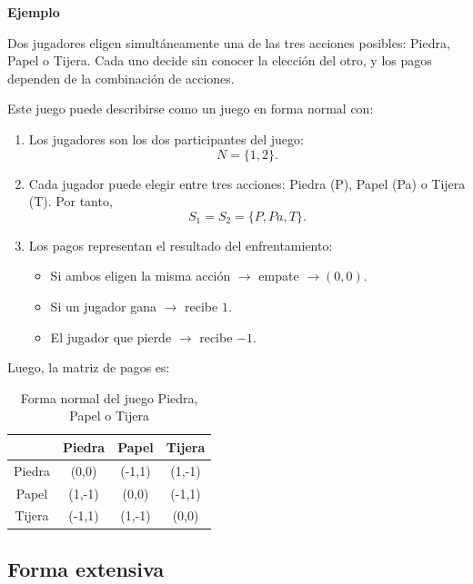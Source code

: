\documentclass[12pt,a4paper,]{book}
\numberwithin{dummy}{section}
\theoremstyle{ocrenumbox}
\theoremstyle{blacknumex}
\theoremstyle{blacknumbox}
\theoremstyle{ocrenum}
\theoremstyle{ocrenum}
\begin{document}
\begin{tcolorbox}[colback=blue!10]
\textbf{Ejemplo}

Dos jugadores eligen simultáneamente una de las tres acciones posibles: Piedra, Papel o Tijera. 
Cada uno decide sin conocer la elección del otro, y los pagos dependen de la combinación de acciones.

Este juego puede describirse como un juego en forma normal con:

\begin{enumerate}
    \item Los jugadores son los dos participantes del juego:
    \[
    N = \{1,2\}.
    \]

    \item Cada jugador puede elegir entre tres acciones: Piedra (P), Papel (Pa) o Tijera (T). 
    Por tanto,
    \[
    S_1 = S_2 = \{P, Pa, T\}.
    \]

    \item Los pagos representan el resultado del enfrentamiento:
    \begin{itemize}
        \item Si ambos eligen la misma acción $\rightarrow$ empate $\rightarrow (0,0)$.
        \item Si un jugador gana $\rightarrow$ recibe $1$.
        \item El jugador que pierde $\rightarrow$ recibe $-1$.
    \end{itemize}
\end{enumerate}

Luego, la matriz de pagos es:

\begin{table}[H]
\centering
\begin{tabular}{c|ccc}
 & Piedra & Papel & Tijera \\
\hline
Piedra & (0,0) & (-1,1) & (1,-1) \\
Papel & (1,-1) & (0,0) & (-1,1) \\
Tijera & (-1,1) & (1,-1) & (0,0) \\
\end{tabular}
\caption{Forma normal del juego Piedra, Papel o Tijera}
\label{tab:ppt}
\end{table}

\end{tcolorbox}

\subsection{Forma extensiva}\label{forma-extensiva}
\end{document}
